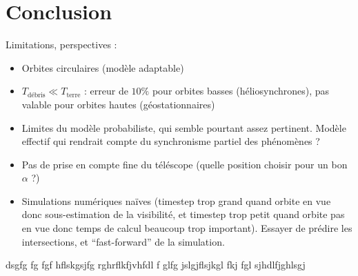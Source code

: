 \documentclass[a4paper,11pt]{article}
\numberwithin{section}{part}
\begin{document}
\section{Conclusion}
Limitations, perspectives :
\begin{itemize}
\item Orbites circulaires (modèle adaptable)
\item $T_{\text{débris}} \ll T_{\text{terre}}$ : erreur de $10\%$ pour
  orbites basses (héliosynchrones), pas valable pour orbites hautes
  (géostationnaires)
\item Limites du modèle probabiliste, qui semble pourtant assez
  pertinent. Modèle effectif qui rendrait compte du synchronisme
  partiel des phénomènes ?
\item Pas de prise en compte fine du téléscope (quelle position
  choisir pour un bon $\alpha$ ?)
\item Simulations numériques naïves (timestep trop grand quand orbite
  en vue donc sous-estimation de la visibilité, et timestep trop petit
  quand orbite pas en vue donc temps de calcul beaucoup trop
  important). Essayer de prédire les intersections, et
  ``fast-forward'' de la simulation.
\end{itemize}






\begin{thebibliography}{99}

dsgfg fg fgf hflskgsjfg rghrflkfjvhfdl f glfg jslgjflsjkgl fkj fgl sjhdlfjghlsgj
\end{thebibliography}
\end{document}
